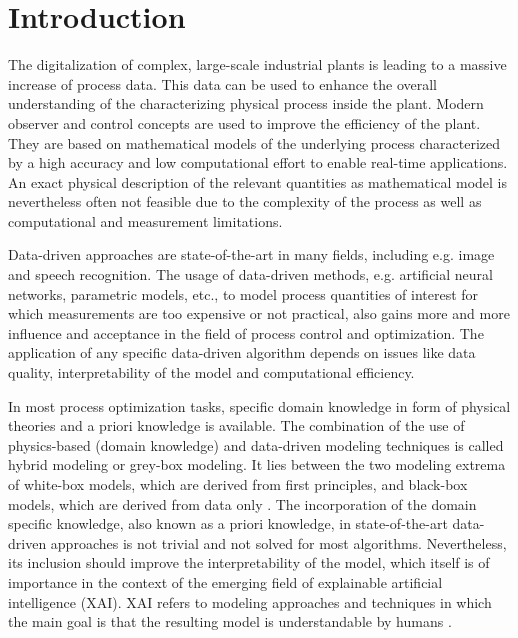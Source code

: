\chapter{Introduction} \label{cha:introduction}

The digitalization of complex, large-scale industrial plants is leading to a massive increase of process data. This data can be used to enhance the overall understanding of the characterizing physical process inside the plant. Modern observer and control concepts are used to improve the efficiency of the plant. They are based on mathematical models of the underlying process characterized by a high accuracy and low computational effort to enable real-time applications. An exact physical description of the relevant quantities as mathematical model is nevertheless often not feasible due to the complexity of the process as well as computational and measurement limitations.

Data-driven approaches are state-of-the-art in many fields, including e.g. image and speech recognition. The usage of data-driven methods, e.g. artificial neural networks, parametric models, etc., to model process quantities of interest for which measurements are too expensive or not practical, also gains more and more influence and acceptance in the field of process control and optimization. The application of any specific data-driven algorithm depends on issues like data quality, interpretability of the model and computational efficiency. 

In most process optimization tasks, specific domain knowledge in form of physical theories and a priori knowledge is available. The combination of the use of physics-based (domain knowledge) and data-driven modeling techniques is called hybrid modeling or grey-box modeling. It lies between the two modeling extrema of white-box models, which are derived from first principles, and black-box models, which are derived from data only \cite{ashby1961introduction}. The incorporation of the domain specific knowledge, also known as a priori knowledge, in state-of-the-art data-driven approaches is not trivial and not solved for most algorithms. Nevertheless, its inclusion should improve the interpretability of the model, which itself is of importance in the context of the emerging field of explainable artificial intelligence (XAI). XAI refers to modeling approaches and techniques in which the main goal is that the resulting model is understandable by humans \cite{dovsilovic2018explainable}.

